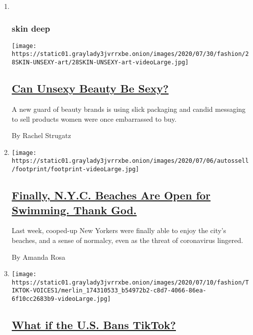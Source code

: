 \begin{enumerate}
\def\labelenumi{\arabic{enumi}.}
\item ~
  \hypertarget{skin-deep}{%
  \subsubsection{skin deep}\label{skin-deep}}

  \texttt{[image: https://static01.graylady3jvrrxbe.onion/images/2020/07/30/fashion/28SKIN-UNSEXY-art/28SKIN-UNSEXY-art-videoLarge.jpg]}

  \hypertarget{can-unsexy-beauty-be-sexy}{%
  \subsection{\texorpdfstring{\href{/2020/07/28/style/can-unsexy-beauty-be-sexy.html}{Can
  Unsexy Beauty Be
  Sexy?}}{Can Unsexy Beauty Be Sexy?}}\label{can-unsexy-beauty-be-sexy}}

  A new guard of beauty brands is using slick packaging and candid
  messaging to sell products women were once embarrassed to buy.

  By Rachel Strugatz
\item
  \texttt{[image: https://static01.graylady3jvrrxbe.onion/images/2020/07/06/autossell/footprint/footprint-videoLarge.jpg]}

  \hypertarget{finally-nyc-beaches-are-open-for-swimming-thank-god}{%
  \subsection{\texorpdfstring{\href{/interactive/2020/07/07/nyregion/nyc-beaches-open.html}{Finally,
  N.Y.C. Beaches Are Open for Swimming. Thank
  God.}}{Finally, N.Y.C. Beaches Are Open for Swimming. Thank God.}}\label{finally-nyc-beaches-are-open-for-swimming-thank-god}}

  Last week, cooped-up New Yorkers were finally able to enjoy the city's
  beaches, and a sense of normalcy, even as the threat of coronavirus
  lingered.

  By Amanda Rosa
\item
  \texttt{[image: https://static01.graylady3jvrrxbe.onion/images/2020/07/10/fashion/TIKTOK-VOICES1/merlin\_174310533\_b54972b2-c8d7-4066-86ea-6f10cc2683b9-videoLarge.jpg]}

  \hypertarget{what-if-the-us-bans-tiktok}{%
  \subsection{\texorpdfstring{\href{/2020/07/10/style/tiktok-ban-us-users-influencers-taylor-lorenz.html}{What
  if the U.S. Bans
  TikTok?}}{What if the U.S. Bans TikTok?}}\label{what-if-the-us-bans-tiktok}}


\end{enumerate}

